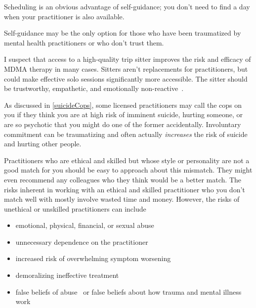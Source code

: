 \documentclass[11pt,oneside]{book}
\let\cite\parencite
\begin{document}
Scheduling is an obvious advantage of self-guidance; you don't need to find a day when your practitioner is also available.

Self-guidance may be the only option for those who have been traumatized by mental health practitioners or who don't trust them.

I suspect that access to a high-quality trip sitter improves the risk and efficacy of MDMA therapy in many cases. Sitters aren't replacements for practitioners, but could make effective solo sessions significantly more accessible. The sitter should be trustworthy, empathetic, and emotionally non-reactive~\cite{thalSitter}.

As discussed in \cref{suicideCops}, some licensed practitioners may call the cops on you if they think you are at high risk of imminent suicide, hurting someone, or are so psychotic that you might do one of the former accidentally. Involuntary commitment can be traumatizing and often actually \textit{increases} the risk of suicide and hurting other people.

Practitioners who are ethical and skilled but whose style or personality are not a good match for you should be easy to approach about this mismatch. They might even recommend any colleagues who they think would be a better match. The risks inherent in working with an ethical and skilled practitioner who you don't match well with mostly involve wasted time and money. However, the risks of unethical or unskilled practitioners can include
\begin{itemize}
    \item emotional, physical, financial, or sexual abuse
    \item unnecessary dependence on the practitioner
    \item increased risk of overwhelming symptom worsening
    \item demoralizing ineffective treatment
    \item false beliefs of abuse~\cite{Scoboria07022017} or false beliefs about how trauma and mental illness work
\end{itemize}
\end{document}
